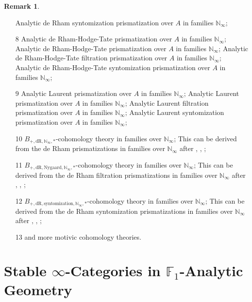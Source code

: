 \documentclass[12pt]{article}
\theoremstyle{definition}
\newtheorem{remark}{Remark}
\begin{document}
\begin{remark}
\begin{itemize}
\subitem[7III] Analytic de Rham syntomization prismatization over $A$ in families $\mathbb{N}_\infty$;
\item[8] Analytic de Rham-Hodge-Tate prismatization over $A$ in families $\mathbb{N}_\infty$;
\subitem[8I] Analytic de Rham-Hodge-Tate prismatization over $A$ in families $\mathbb{N}_\infty$;
\subitem[8II] Analytic de Rham-Hodge-Tate filtration prismatization over $A$ in families $\mathbb{N}_\infty$;
\subitem[8III] Analytic de Rham-Hodge-Tate syntomization prismatization over $A$ in families $\mathbb{N}_\infty$;
\item[9] Analytic Laurent prismatization over $A$ in families $\mathbb{N}_\infty$;
\subitem[9I] Analytic Laurent prismatization over $A$ in families $\mathbb{N}_\infty$;
\subitem[9II] Analytic Laurent filtration prismatization over $A$ in families $\mathbb{N}_\infty$;
\subitem[9III] Analytic Laurent syntomization prismatization over $A$ in families $\mathbb{N}_\infty$;
\item[10] $B_{+,\mathrm{dR},\mathbb{N}_\infty,*}$-cohomology theory in families over $\mathbb{N}_\infty$;
\subitem[$\blacksquare$] This can be derived from the de Rham prismatizations in families over $\mathbb{N}_\infty$ after \cite{3Ta}, \cite{3F}, \cite{3S3};
\item[11] $B_{+,\mathrm{dR},\mathrm{Nygaard},\mathbb{N}_\infty,*}$-cohomology theory in families over $\mathbb{N}_\infty$;
\subitem[$\blacksquare$] This can be derived from the de Rham filtration prismatizations in families over $\mathbb{N}_\infty$ after \cite{3Ta}, \cite{3F}, \cite{3S3};
\item[12] $B_{+,\mathrm{dR},\mathrm{syntomization},\mathbb{N}_\infty,*}$-cohomology theory in families over $\mathbb{N}_\infty$;
\subitem[$\blacksquare$] This can be derived from the de Rham syntomization  prismatizations in families over $\mathbb{N}_\infty$ after \cite{3Ta}, \cite{3F}, \cite{3S3};
\item[13] and more motivic cohomology theories.
\end{itemize}
\end{remark}












\newpage
\section{Stable $\infty$-Categories in $\mathbb{F}_1$-Analytic Geometry}
\end{document}
